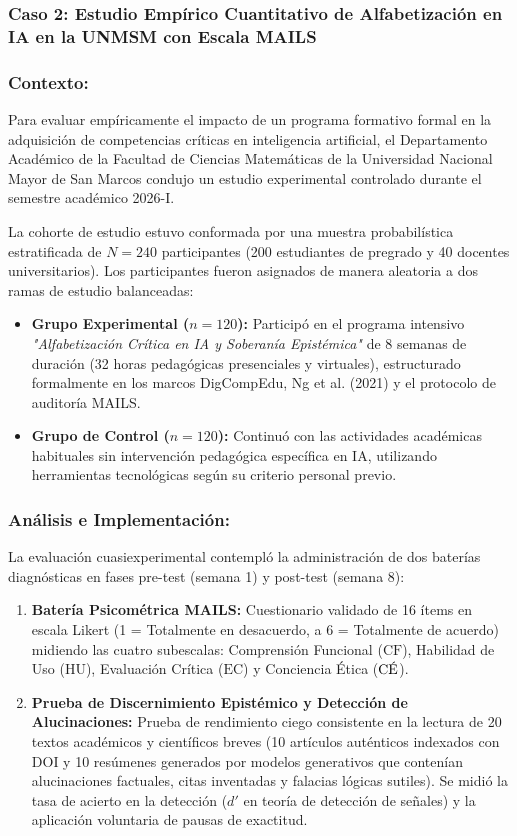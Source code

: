 \newpage

\subsubsection{Caso 2: Estudio Empírico Cuantitativo de Alfabetización en IA en la UNMSM con Escala MAILS}

\subsubsection*{Contexto:}
Para evaluar empíricamente el impacto de un programa formativo formal en la adquisición de competencias críticas en inteligencia artificial, el Departamento Académico de la Facultad de Ciencias Matemáticas de la Universidad Nacional Mayor de San Marcos condujo un estudio experimental controlado durante el semestre académico 2026-I.

La cohorte de estudio estuvo conformada por una muestra probabilística estratificada de $N = 240$ participantes (200 estudiantes de pregrado y 40 docentes universitarios). Los participantes fueron asignados de manera aleatoria a dos ramas de estudio balanceadas:
\begin{itemize}
    \item \textbf{Grupo Experimental ($n = 120$):} Participó en el programa intensivo \textit{"Alfabetización Crítica en IA y Soberanía Epistémica"} de 8 semanas de duración (32 horas pedagógicas presenciales y virtuales), estructurado formalmente en los marcos DigCompEdu, Ng et al. (2021) y el protocolo de auditoría MAILS.
    \item \textbf{Grupo de Control ($n = 120$):} Continuó con las actividades académicas habituales sin intervención pedagógica específica en IA, utilizando herramientas tecnológicas según su criterio personal previo.
\end{itemize}

\subsubsection*{Análisis e Implementación:}
La evaluación cuasiexperimental contempló la administración de dos baterías diagnósticas en fases pre-test (semana 1) y post-test (semana 8):
\begin{enumerate}
    \item \textbf{Batería Psicométrica MAILS:} Cuestionario validado de 16 ítems en escala Likert (1 = Totalmente en desacuerdo, a 6 = Totalmente de acuerdo) midiendo las cuatro subescalas: Comprensión Funcional ($\text{CF}$), Habilidad de Uso ($\text{HU}$), Evaluación Crítica ($\text{EC}$) y Conciencia Ética ($\text{C\text{\'E}}$).
    \item \textbf{Prueba de Discernimiento Epistémico y Detección de Alucinaciones:} Prueba de rendimiento ciego consistente en la lectura de 20 textos académicos y científicos breves (10 artículos auténticos indexados con DOI y 10 resúmenes generados por modelos generativos que contenían alucinaciones factuales, citas inventadas y falacias lógicas sutiles). Se midió la tasa de acierto en la detección ($d'$ en teoría de detección de señales) y la aplicación voluntaria de pausas de exactitud.
\end{enumerate}

